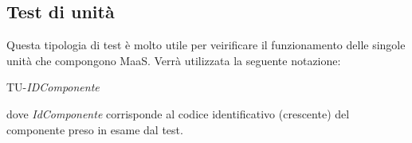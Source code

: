 \newpage
\subsection{Test di unità}
Questa tipologia di test è molto utile per veirificare il funzionamento delle singole unità che compongono MaaS.
Verrà utilizzata la seguente notazione:
	\begin{center}
		TU-\textit{IDComponente}
	\end{center}
dove \textit{IdComponente} corrisponde al codice identificativo (crescente) del componente preso in esame dal test.




 

